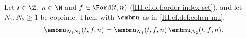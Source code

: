 Let $t\in\Z$, $n\in\N$ and $f\in\Ford(t,n)$ (\cref{III.ef.def:order-index-set}), and let $N_1,N_2\ge1$ be coprime. Then, with $\embmu$ as in
\cref{III.ef.def:cohen-mu},
\[
  \embmu_{N_1N_2}(t,f,n)=\embmu_{N_1}(t,f,n)\,\embmu_{N_2}(t,f,n).
\]
